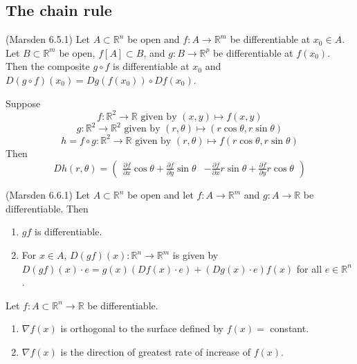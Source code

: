 \subsection{The chain rule}
\begin{mytheorem}
(Marsden 6.5.1) Let $A\subset \mathbb{R}^n$ be open and $f:A\to \mathbb{R}^m$ be differentiable at $x_0\in A$. Let $B\subset \mathbb{R}^m$ be open, $f[A]\subset B$, and $g:B\to \mathbb{R}^p$ be differentiable at $f(x_0)$. Then the composite $g\circ f$ is differentiable at $x_0$ and $D(g\circ f)(x_0)=Dg(f(x_0))\circ Df(x_0)$.
\end{mytheorem}

\begin{example}
Suppose
$$f:\mathbb{R}^2\to \mathbb{R}\text{ given by } (x,y)\mapsto f(x,y)$$
$$g:\mathbb{R}^2\to \mathbb{R}^2\text{ given by } (r,\theta)\mapsto (r\cos\theta, r\sin\theta)$$
$$h = f\circ g: \mathbb{R}^2\to \mathbb{R}\text{ given by }(r,\theta)\mapsto f(r\cos\theta, r\sin\theta)$$
Then
\begingroup
\everymath{\displaystyle}
$$Dh(r,\theta)=
\begin{pmatrix}
\frac{\partial f}{\partial x}\cos\theta+\frac{\partial f}{\partial y}\sin\theta & -\frac{\partial f}{\partial x}r\sin\theta + \frac{\partial f}{\partial y}r\cos\theta
\end{pmatrix}$$
\endgroup
\end{example}


\begin{myproposition}
(Marsden 6.6.1) Let $A\subset \mathbb{R}^n$ be open and let $f:A\to \mathbb{R}^m$ and $g:A\to \mathbb{R}$ be differentiable. Then
\begin{enumerate}[label={(\alph*)}]
\item $gf$ is differentiable.
\item For $x\in A$, $D(gf)(x):\mathbb{R}^n\to \mathbb{R}^m$ is given by $D(gf)(x)\cdot e=g(x)(Df(x)\cdot e)+(Dg(x)\cdot e)f(x)$ for all $e\in \mathbb{R}^n$.
\end{enumerate}
\end{myproposition}

\begin{myproposition}
Let $f:A\subset \mathbb{R}^n\to \mathbb{R}$ be differentiable.
\begin{enumerate}[label={(\alph*)}]
\item $\nabla f(x)$ is orthogonal to the surface defined by $f(x)=$ constant.
\item $\nabla f(x)$ is the direction of greatest rate of increase of $f(x)$.
\end{enumerate}
\end{myproposition}

